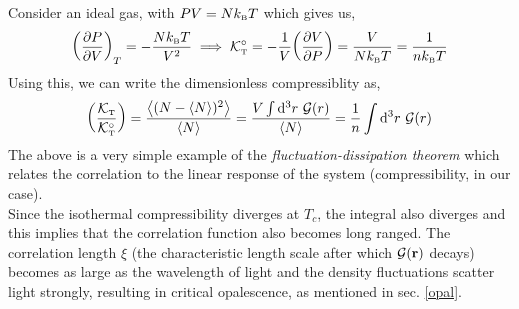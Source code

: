 Consider an ideal gas, with $PV = Nk_{\text{\tiny B}} T$ which gives us, 
$$\qty(\pdv{P}{V})_{T} = -\frac{N\kb T}{V^2}\implies  \tensor*{\SK}{_{\text{\tiny T}} ^\circ} = -\frac{1}{V}\qty(\pdv{V}{P}) = \frac{V}{N\kb T} =\frac{1}{n\kb T}$$
Using this, we can write the dimensionless compressiblity as,
\begin{align*}
   \qty( \frac{\SK\tund{T}}{\tensor*{\SK}{_{\text{\tiny T}} ^\circ}} )= \frac{\avg{(N-\avg{N})^2}}{\avg{N}} = \frac{V\int \dd^3 r\ \SG(r)}{\avg{N}} = \frac{1}{n}\int \dd^3 r\ \SG(r)
\end{align*}
The above is a very simple example of the \textit{fluctuation-dissipation theorem} which relates the correlation to the linear response of the system (compressibility, in our case).\\[0.2cm]
Since the isothermal compressibility diverges at $T_c$, the integral also diverges and this implies that the correlation function also becomes long ranged. The correlation length $\xi$ (the characteristic length scale after which $\mathcal G(\vb{r})$ decays) becomes as large as the wavelength of light and the density fluctuations scatter light strongly, resulting in critical opalescence, as mentioned in sec. \ref{opal}.
